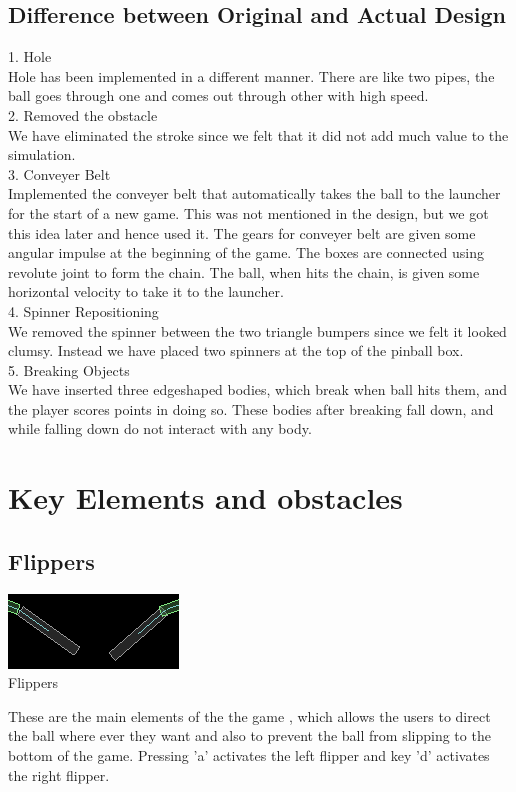 \documentclass[11pt]{article}
\begin{document}
\subsection{Difference between Original and Actual Design}
1. Hole\\
Hole has been implemented in a different manner. There are like two pipes, the ball goes through one and comes out through other with high speed. \\
2. Removed the obstacle\\
We have eliminated the stroke since we felt that it did not add much value to the simulation. \\
3. Conveyer Belt\\
Implemented the conveyer belt that automatically takes the ball to the launcher for the start of a new game. This was not mentioned in the design, but we got this idea later and hence used it. The gears for conveyer belt are given some angular impulse at the beginning of the game. The boxes are connected using revolute joint to form the chain. The ball, when hits the chain, is given some horizontal velocity to take it to the launcher.\\
4. Spinner Repositioning \\
We removed the spinner between the two triangle bumpers since we felt it looked clumsy. Instead we have placed two spinners at the top of the pinball box.\\
5. Breaking Objects\\
We have inserted three edgeshaped bodies, which break when ball hits them, and the player scores points in doing so. These bodies after breaking fall down, and while falling down do not interact with any body.

\section{Key Elements and obstacles}
\subsection{Flippers}
\begin{center}

\includegraphics[scale=0.5]{../plots/flippers.png}\\
Flippers
\end{center}
These are the main elements of the the game , which allows the users to direct the ball where ever they want and also to prevent the ball from slipping to the bottom of the game. Pressing 'a' activates the left flipper and key 'd' activates the right flipper.
\end{document}
